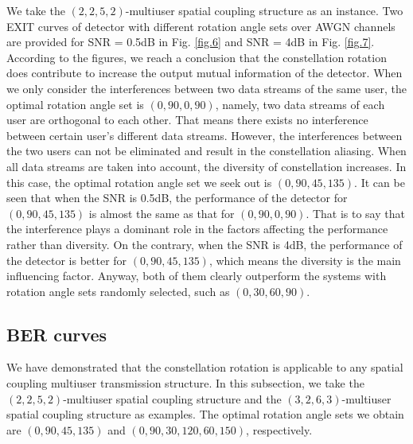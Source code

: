 \documentclass[conference]{IEEEtran}
\begin{document}
We take the $(2,2,5,2)$-multiuser spatial coupling structure as an instance. Two EXIT curves of detector with different rotation angle sets over AWGN channels are provided for SNR = 0.5dB in Fig. \ref{fig.6} and SNR = 4dB in Fig. \ref{fig.7}. According to the figures, we reach a conclusion that the constellation rotation does contribute to increase the output mutual information of the detector. When we only consider the interferences between two data streams of the same user, the optimal rotation angle set is $(0,90,0,90)$, namely, two data streams of each user are orthogonal to each other. That means there exists no interference between certain user's different data streams. However, the interferences between the two users can not be eliminated and result in the constellation aliasing. When all data streams are taken into account, the diversity of constellation increases. In this case, the optimal rotation angle set we seek out is $(0,90,45,135)$. It can be seen that when the SNR is 0.5dB, the performance of the detector for $(0,90,45,135)$ is almost the same as that for $(0,90,0,90)$. That is to say that the interference plays a dominant role in the factors affecting the performance rather than diversity. On the contrary, when the SNR is 4dB, the performance of the detector is better for $(0,90,45,135)$, which means the diversity is the main influencing factor. Anyway, both of them clearly outperform the systems with rotation angle sets randomly selected, such as $(0,30,60,90)$.
\subsection{BER curves}
We have demonstrated that the constellation rotation is applicable to any spatial coupling multiuser transmission structure. In this subsection, we take the $(2,2,5,2)$-multiuser spatial coupling structure and the $(3,2,6,3)$-multiuser spatial coupling structure as examples. The optimal rotation angle sets we obtain are $(0,90,45,135)$ and $(0,90,30,120,60,150)$, respectively.
\end{document}

